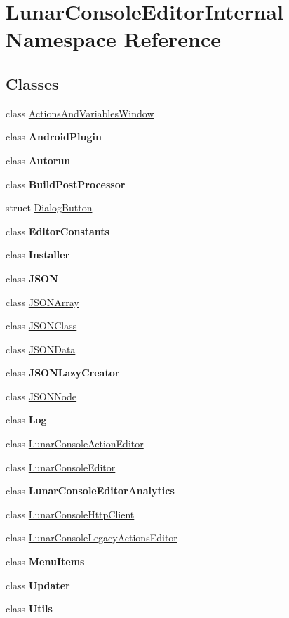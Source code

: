\hypertarget{namespace_lunar_console_editor_internal}{}\section{Lunar\+Console\+Editor\+Internal Namespace Reference}
\label{namespace_lunar_console_editor_internal}
\subsection*{Classes}
\begin{DoxyCompactItemize}
\item 
class \mbox{\hyperlink{class_lunar_console_editor_internal_1_1_actions_and_variables_window}{Actions\+And\+Variables\+Window}}
\item 
class {\bfseries Android\+Plugin}
\item 
class {\bfseries Autorun}
\item 
class {\bfseries Build\+Post\+Processor}
\item 
struct \mbox{\hyperlink{struct_lunar_console_editor_internal_1_1_dialog_button}{Dialog\+Button}}
\item 
class {\bfseries Editor\+Constants}
\item 
class {\bfseries Installer}
\item 
class {\bfseries J\+S\+ON}
\item 
class \mbox{\hyperlink{class_lunar_console_editor_internal_1_1_j_s_o_n_array}{J\+S\+O\+N\+Array}}
\item 
class \mbox{\hyperlink{class_lunar_console_editor_internal_1_1_j_s_o_n_class}{J\+S\+O\+N\+Class}}
\item 
class \mbox{\hyperlink{class_lunar_console_editor_internal_1_1_j_s_o_n_data}{J\+S\+O\+N\+Data}}
\item 
class {\bfseries J\+S\+O\+N\+Lazy\+Creator}
\item 
class \mbox{\hyperlink{class_lunar_console_editor_internal_1_1_j_s_o_n_node}{J\+S\+O\+N\+Node}}
\item 
class {\bfseries Log}
\item 
class \mbox{\hyperlink{class_lunar_console_editor_internal_1_1_lunar_console_action_editor}{Lunar\+Console\+Action\+Editor}}
\item 
class \mbox{\hyperlink{class_lunar_console_editor_internal_1_1_lunar_console_editor}{Lunar\+Console\+Editor}}
\item 
class {\bfseries Lunar\+Console\+Editor\+Analytics}
\item 
class \mbox{\hyperlink{class_lunar_console_editor_internal_1_1_lunar_console_http_client}{Lunar\+Console\+Http\+Client}}
\item 
class \mbox{\hyperlink{class_lunar_console_editor_internal_1_1_lunar_console_legacy_actions_editor}{Lunar\+Console\+Legacy\+Actions\+Editor}}
\item 
class {\bfseries Menu\+Items}
\item 
class {\bfseries Updater}
\item 
class {\bfseries Utils}
\end{DoxyCompactItemize}
